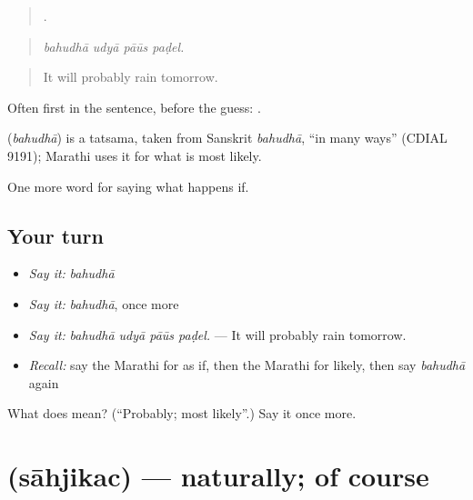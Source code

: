 \begin{quote}
   .
\end{quote}

\begin{quote}
\emph{bahudhā udyā pāūs paḍel.}
\end{quote}

\begin{quote}
It will probably rain tomorrow.
\end{quote}

Often first in the sentence, before the guess:   .

\begin{cousinweb}
\textbf{} (\emph{bahudhā}) is a tatsama, taken from Sanskrit \emph{bahudhā}, \textquotedblleft{}in many ways\textquotedblright{} (CDIAL 9191); Marathi uses it for what is most likely.
\end{cousinweb}

\begin{grammarlens}[title={What you've built}]
One more word for saying what happens if.
\end{grammarlens}

\subsection*{Your turn}
\begin{itemize}
\raggedright
  \item \emph{Say it:} \emph{bahudhā}
  \item \emph{Say it:} \emph{bahudhā}, once more
  \item \emph{Say it:} \emph{bahudhā udyā pāūs paḍel.} — It will probably rain tomorrow.
  \item \emph{Recall:} say the Marathi for as if, then the Marathi for likely, then say \emph{bahudhā} again
\end{itemize}

\begin{tcolorbox}[breakable,colback=teal!4,colframe=teal!35!black,title={Before you move on}]
What does  mean? (\textquotedblleft{}Probably; most likely\textquotedblright{}.) Say it once more.
\end{tcolorbox}
\section[\texorpdfstring{\mr{साहजिकच} (sāhjikac)}{साहजिकच (sāhjikac)}]{ (sāhjikac) — naturally; of course}

